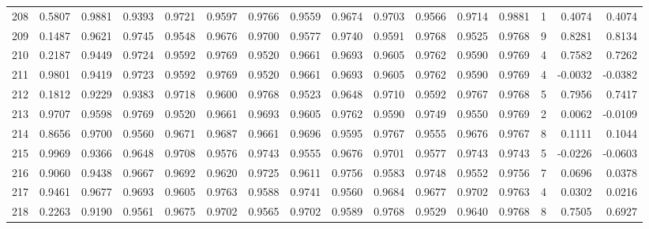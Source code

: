 \begin{tabular}{lrrrrrrrrrrrrrrr}
208 &      0.5807 &  0.9881 &  0.9393 &  0.9721 &  0.9597 &  0.9766 &  0.9559 &  0.9674 &  0.9703 &  0.9566 &   0.9714 &     0.9881 &      1 &                    0.4074 &                     0.4074 \\
209 &      0.1487 &  0.9621 &  0.9745 &  0.9548 &  0.9676 &  0.9700 &  0.9577 &  0.9740 &  0.9591 &  0.9768 &   0.9525 &     0.9768 &      9 &                    0.8281 &                     0.8134 \\
210 &      0.2187 &  0.9449 &  0.9724 &  0.9592 &  0.9769 &  0.9520 &  0.9661 &  0.9693 &  0.9605 &  0.9762 &   0.9590 &     0.9769 &      4 &                    0.7582 &                     0.7262 \\
211 &      0.9801 &  0.9419 &  0.9723 &  0.9592 &  0.9769 &  0.9520 &  0.9661 &  0.9693 &  0.9605 &  0.9762 &   0.9590 &     0.9769 &      4 &                   -0.0032 &                    -0.0382 \\
212 &      0.1812 &  0.9229 &  0.9383 &  0.9718 &  0.9600 &  0.9768 &  0.9523 &  0.9648 &  0.9710 &  0.9592 &   0.9767 &     0.9768 &      5 &                    0.7956 &                     0.7417 \\
213 &      0.9707 &  0.9598 &  0.9769 &  0.9520 &  0.9661 &  0.9693 &  0.9605 &  0.9762 &  0.9590 &  0.9749 &   0.9550 &     0.9769 &      2 &                    0.0062 &                    -0.0109 \\
214 &      0.8656 &  0.9700 &  0.9560 &  0.9671 &  0.9687 &  0.9661 &  0.9696 &  0.9595 &  0.9767 &  0.9555 &   0.9676 &     0.9767 &      8 &                    0.1111 &                     0.1044 \\
215 &      0.9969 &  0.9366 &  0.9648 &  0.9708 &  0.9576 &  0.9743 &  0.9555 &  0.9676 &  0.9701 &  0.9577 &   0.9743 &     0.9743 &      5 &                   -0.0226 &                    -0.0603 \\
216 &      0.9060 &  0.9438 &  0.9667 &  0.9692 &  0.9620 &  0.9725 &  0.9611 &  0.9756 &  0.9583 &  0.9748 &   0.9552 &     0.9756 &      7 &                    0.0696 &                     0.0378 \\
217 &      0.9461 &  0.9677 &  0.9693 &  0.9605 &  0.9763 &  0.9588 &  0.9741 &  0.9560 &  0.9684 &  0.9677 &   0.9702 &     0.9763 &      4 &                    0.0302 &                     0.0216 \\
218 &      0.2263 &  0.9190 &  0.9561 &  0.9675 &  0.9702 &  0.9565 &  0.9702 &  0.9589 &  0.9768 &  0.9529 &   0.9640 &     0.9768 &      8 &                    0.7505 &                     0.6927 \\

\end{tabular}
